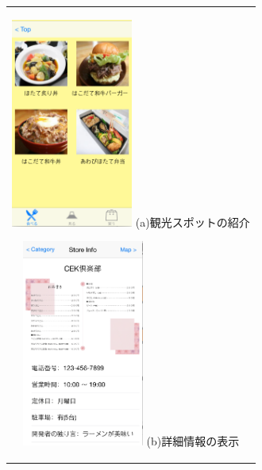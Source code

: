 \begin{figure}[htbp]
  \begin{center}
    \begin{tabular}{c}

      \begin{minipage}{0.33\hsize}
        \begin{center}
\includegraphics[width=4cm, bb=0 0 320 552]{5.4_category.png}
          \hspace{1cm}%
          {\footnotesize (a)観光スポットの紹介}
        \end{center}
      \end{minipage}

      \begin{minipage}{0.33\hsize}
        \begin{center}
\includegraphics[width=4cm, bb=0 0 321 547]{5.4_detail.png}
          \hspace{1cm}%
          {\footnotesize (b)詳細情報の表示}
        \end{center}
      \end{minipage}


\end{tabular}
\end{center}
\end{figure}
